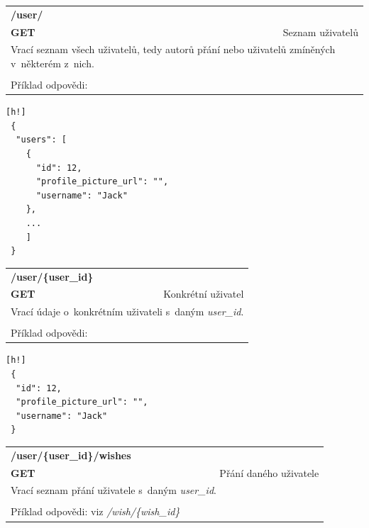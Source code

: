 \documentclass[thesis=B,czech]{FITthesis}[2012/06/26]
\begin{document}
\begin{table}[h]
\begin{tabular}{llllr}
\rowcolor[HTML]{EFEFEF}
\large \textbf{/user/}        &         &                 &        & \multicolumn{1}{l}{}                \\
\rowcolor[HTML]{EFEFEF}
\textbf{GET}          &         &                 &        & Seznam uživatelů                        \\
\multicolumn{5}{l}{\parbox[t]{12.8cm}{Vrací seznam všech uživatelů, tedy autorů přání nebo uživatelů zmíněných v~některém z~nich. }  } \\   
 & & & & \\
 Příklad odpovědi:
\end{tabular}
\end{table}

\begin{lstlisting}[nolol=true][h!]
 {
  "users": [
    {
      "id": 12,
      "profile_picture_url": "",
      "username": "Jack"
    },
    ...
    ]
 }
\end{lstlisting} 

\begin{table}[h]
\begin{tabular}{llllr}
\rowcolor[HTML]{EFEFEF}
\large \textbf{/user/\{user\_id\}}        &         &                 &        & \multicolumn{1}{l}{}                \\
\rowcolor[HTML]{EFEFEF}
\textbf{GET}          &         &                 &        & Konkrétní uživatel                        \\
\multicolumn{5}{l}{\parbox[t]{12.8cm}{Vrací údaje o~konkrétním uživateli s~daným \textit{user\_id}. }  } \\  
 & & & & \\
 Příklad odpovědi:
\end{tabular}
\end{table}

\begin{lstlisting}[nolol=true][h!]
 {
  "id": 12,
  "profile_picture_url": "",
  "username": "Jack"
 }
\end{lstlisting} 

\begin{table}[h]
\begin{tabular}{llllr}
\rowcolor[HTML]{EFEFEF}
\large \textbf{/user/\{user\_id\}/wishes}        &         &                 &        & \multicolumn{1}{l}{}                \\
\rowcolor[HTML]{EFEFEF}
\textbf{GET}          &         &                 &        & Přání daného uživatele                        \\
\multicolumn{5}{l}{\parbox[t]{12.8cm}{Vrací seznam přání uživatele s~daným \textit{user\_id}. }  } \\  
 & & & & \\
 Příklad odpovědi: viz \textit{/wish/\{wish\_id\}}
\end{tabular}
\end{table}
\end{document}
